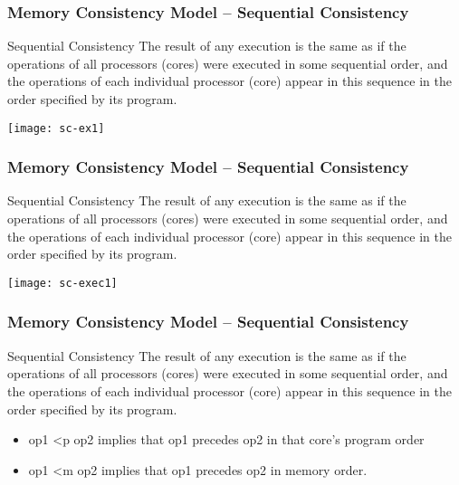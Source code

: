 \begin{frame}[plain]	
    \frametitle{Memory Consistency Model --  Sequential Consistency}
    
    \begin{block}{Sequential Consistency}
        The result of any         execution is the same as if the operations of all processors (cores) were executed in some sequential         order, and the operations of each individual processor (core) appear in this sequence in the order        specified by its program.
    \end{block} 
    \centering
    \texttt{[image: sc-ex1]}
    
\end{frame}

\begin{frame}[plain]	
    \frametitle{Memory Consistency Model --  Sequential Consistency}
    
    \begin{block}{Sequential Consistency}
        The result of any         execution is the same as if the operations of all processors (cores) were executed in some sequential         order, and the operations of each individual processor (core) appear in this sequence in the order        specified by its program.
    \end{block} 
    \centering
    \texttt{[image: sc-exec1]}

\end{frame}

\begin{frame}[plain]	
    \frametitle{Memory Consistency Model --  Sequential Consistency}
    
    \begin{block}{Sequential Consistency}
        The result of any         execution is the same as if the operations of all processors (cores) were executed in some sequential         order, and the operations of each individual processor (core) appear in this sequence in the order        specified by its program.
    \end{block} 
     
    \begin{itemize}
        \item op1 <p op2 implies that op1 precedes op2 in that core’s program order
        \item op1 <m op2 implies that op1 precedes op2 in memory order.
			                
    \end{itemize}
\end{frame}


